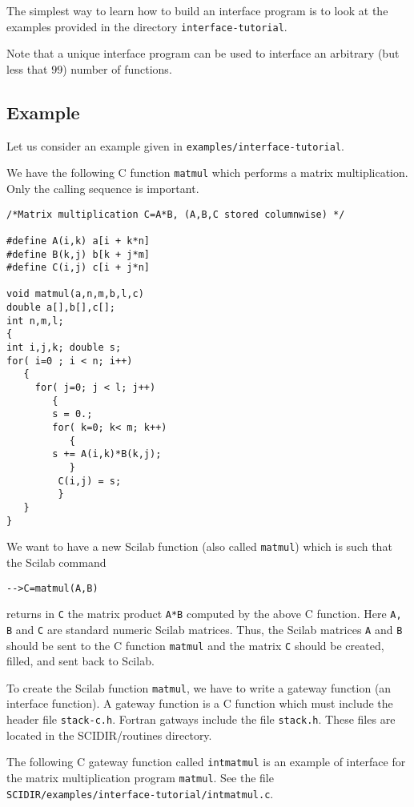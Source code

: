 The simplest way to learn how to build an interface program is to 
look at the examples provided in the directory {\tt interface-tutorial}.

Note that a unique interface program can be used to interface an 
arbitrary (but less that $99$) number of functions.

\subsection{Example}
\label{interface}
Let us consider an example given in {\tt examples/interface-tutorial}.

We have the following C function \verb!matmul! which performs 
a matrix multiplication. Only the calling sequence is important.
\scriptsize
\begin{verbatim}
/*Matrix multiplication C=A*B, (A,B,C stored columnwise) */

#define A(i,k) a[i + k*n]
#define B(k,j) b[k + j*m]
#define C(i,j) c[i + j*n]

void matmul(a,n,m,b,l,c)
double a[],b[],c[];
int n,m,l;
{
int i,j,k; double s;
for( i=0 ; i < n; i++)
   {
     for( j=0; j < l; j++)
        {
        s = 0.;
        for( k=0; k< m; k++)
           {
	    s += A(i,k)*B(k,j);
           }
         C(i,j) = s;
         }
   }
}
\end{verbatim}
\normalsize

We want to have a new Scilab function (also called \verb!matmul!)
which is such that the Scilab command 
\begin{verbatim}
-->C=matmul(A,B)
\end{verbatim}
returns in \verb!C! the matrix product \verb!A*B! computed
by the above C function. Here \verb!A, B! and \verb!C! are standard
numeric Scilab matrices. Thus, the Scilab matrices \verb!A! and \verb!B! 
should be sent to the C function \verb!matmul! and the matrix 
\verb!C! should be created, filled, and sent back to Scilab.

To create the Scilab function \verb!matmul!, we have to write 
a gateway function (an interface function).
A gateway function is a C function which must include the header file
{\tt stack-c.h}. Fortran gatways include the file {\tt stack.h}.
These files are located in the SCIDIR/routines directory.

The following C gateway function called
\verb!intmatmul! is an example of interface for the matrix multiplication
program {\tt matmul}. See the file \newline
\verb!SCIDIR/examples/interface-tutorial/intmatmul.c!.

